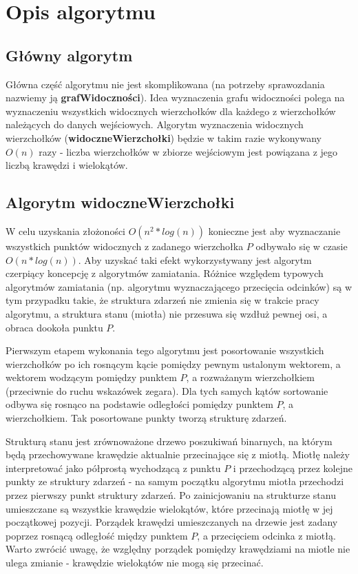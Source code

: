 \documentclass{article}
\begin{document}
\section{Opis algorytmu}
\subsection{Główny algorytm}
\qquad Główna część algorytmu nie jest skomplikowana (na potrzeby sprawozdania nazwiemy ją \textbf{grafWidoczności}). Idea wyznaczenia grafu widoczności polega na wyznaczeniu wszystkich widocznych wierzchołków dla każdego z wierzchołków należących do danych wejściowych. Algorytm wyznaczenia widocznych wierzchołków (\textbf{widoczneWierzchołki}) będzie w takim razie wykonywany $O(n)$ razy - liczba wierzchołków w zbiorze wejściowym jest powiązana z jego liczbą krawędzi i wielokątów. 
\subsection{Algorytm \textbf{widoczneWierzchołki}}
\qquad W celu uzyskania złożoności $O(n^2*log(n))$ konieczne jest aby wyznaczanie wszystkich punktów widocznych z zadanego wierzchołka $P$ odbywało się w czasie $O(n*log(n))$. Aby uzyskać taki efekt wykorzystywany jest algorytm czerpiący koncepcję z algorytmów zamiatania. Różnice względem typowych algorytmów zamiatania (np. algorytmu wyznaczającego przecięcia odcinków) są w tym przypadku takie, że struktura zdarzeń nie zmienia się w trakcie pracy algorytmu, a struktura stanu (miotła) nie przesuwa się wzdłuż pewnej osi, a obraca dookoła punktu $P$.

\noindent \qquad Pierwszym etapem wykonania tego algorytmu jest posortowanie wszystkich wierzchołków po ich rosnącym kącie pomiędzy pewnym ustalonym wektorem, a wektorem wodzącym pomiędzy punktem $P$, a rozważanym wierzchołkiem (przeciwnie do ruchu wskazówek zegara). Dla tych samych kątów sortowanie odbywa się rosnąco na podstawie odległości pomiędzy punktem $P$, a wierzchołkiem. Tak posortowane punkty tworzą strukturę zdarzeń.

\noindent \qquad  Strukturą stanu jest zrównoważone drzewo poszukiwań binarnych, na którym będą przechowywane krawędzie aktualnie przecinające się z miotłą. Miotłę należy interpretować jako półprostą wychodzącą z punktu $P$ i przechodzącą przez kolejne punkty ze struktury zdarzeń - na samym początku algorytmu miotła przechodzi przez pierwszy punkt struktury zdarzeń. Po zainicjowaniu na strukturze stanu umieszczane są wszystkie krawędzie wielokątów, które przecinają miotłę w jej początkowej pozycji. Porządek krawędzi umieszczanych na drzewie jest zadany poprzez rosnącą odległość między punktem $P$, a przecięciem odcinka z miotłą. Warto zwrócić uwagę, że względny porządek pomiędzy krawędziami na miotle nie ulega zmianie - krawędzie wielokątów nie mogą się przecinać.
\end{document}
